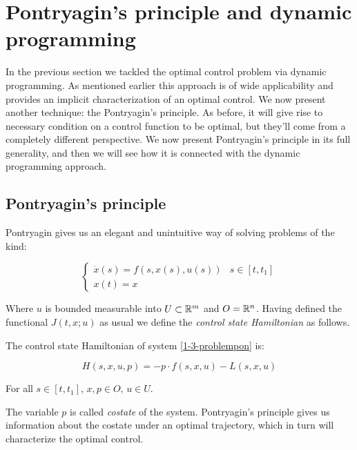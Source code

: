 \section{Pontryagin's principle and dynamic programming}

In the previous section we tackled the optimal control problem via dynamic programming.
As mentioned earlier this approach is of wide applicability and provides an implicit 
characterization of an optimal control. We now present another technique: the Pontryagin's principle.
As before, it will give rise to necessary condition on a control function 
to be optimal, but they'll come from a completely different perspective. We now present Pontryagin's 
principle in its full generality, and then we will see how it is connected with 
the dynamic programming approach. 

\subsection{Pontryagin's principle}

Pontryagin gives us an elegant and unintuitive way of solving problems of the kind:

\begin{equation}\label{1-3-problempon}
    \begin{cases}
        \dot{x}(s) = f(s,x(s),u(s)) & s\in [t,t_1] \\
        x(t) = x
    \end{cases}
\end{equation}

Where $u$ is bounded measurable into $U\subset\mathbb{R}^m$ and $O=\mathbb{R}^n$. Having defined the 
functional $J(t,x;u)$ as usual we define the \textit{control state Hamiltonian} 
as follows.

\begin{definition}
    The control state Hamiltonian of system \ref{1-3-problempon} is:

    \begin{equation}\label{1-3-hamiltonian}
        H(s,x,u,p) = - p \cdot f(s,x,u) - L(s,x,u)
    \end{equation}

    For all $s\in[t,t_1],\,x,p\in O,\,u\in U$.
\end{definition}

The variable $p$ is called \textit{costate} of the system. Pontryagin's principle 
gives us information about the costate under an optimal trajectory, which in turn will 
characterize the optimal control. 

